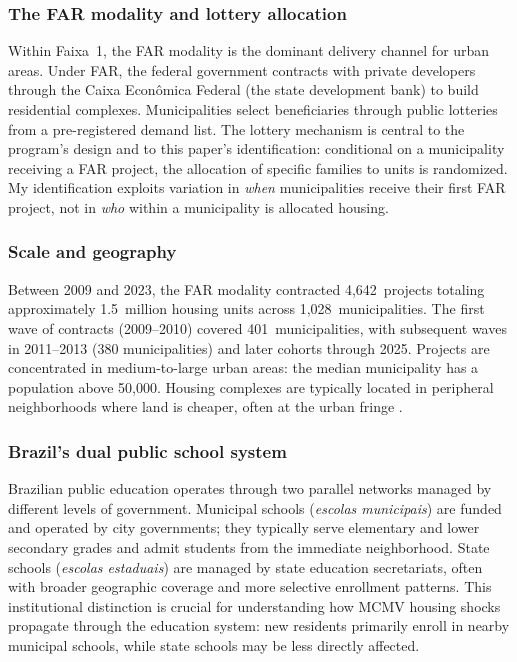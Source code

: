 \documentclass[12pt]{article}
\begin{document}
\subsubsection*{The FAR modality and lottery allocation} Within Faixa~1, the FAR modality is the dominant delivery channel for urban areas. Under FAR, the federal government contracts with private developers through the Caixa Econ\^omica Federal (the state development bank) to build residential complexes. Municipalities select beneficiaries through public lotteries from a pre-registered demand list. The lottery mechanism is central to the program's design and to this paper's identification: conditional on a municipality receiving a FAR project, the allocation of specific families to units is randomized. My identification exploits variation in \textit{when} municipalities receive their first FAR project, not in \textit{who} within a municipality is allocated housing.

\subsubsection*{Scale and geography} Between 2009 and 2023, the FAR modality contracted 4,642~projects totaling approximately 1.5~million housing units across 1,028~municipalities. The first wave of contracts (2009--2010) covered 401~municipalities, with subsequent waves in 2011--2013 (380 municipalities) and later cohorts through 2025. Projects are concentrated in medium-to-large urban areas: the median municipality has a population above 50,000. Housing complexes are typically located in peripheral neighborhoods where land is cheaper, often at the urban fringe \citep{rolnik2015guerra}.

\subsubsection*{Brazil's dual public school system} Brazilian public education operates through two parallel networks managed by different levels of government. Municipal schools (\textit{escolas municipais}) are funded and operated by city governments; they typically serve elementary and lower secondary grades and admit students from the immediate neighborhood. State schools (\textit{escolas estaduais}) are managed by state education secretariats, often with broader geographic coverage and more selective enrollment patterns. This institutional distinction is crucial for understanding how MCMV housing shocks propagate through the education system: new residents primarily enroll in nearby municipal schools, while state schools may be less directly affected.
\end{document}
